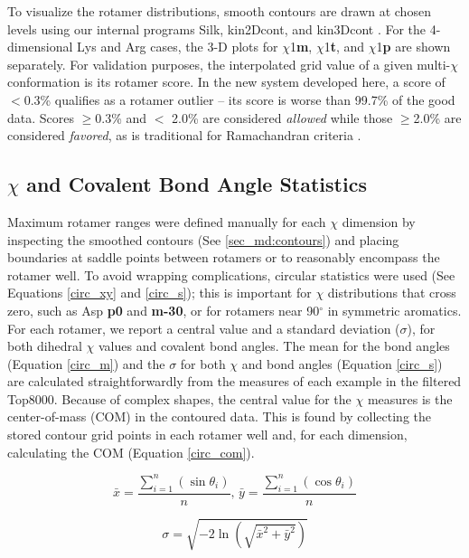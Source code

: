 To visualize the rotamer distributions, smooth contours are drawn at chosen levels using our internal programs Silk, kin2Dcont, and kin3Dcont \cite{Thesis:Word,Thesis:Davis}. For the 4-dimensional Lys and Arg cases, the 3-D plots for $\chi$1\textbf{m}, $\chi$1\textbf{t}, and $\chi$1\textbf{p} are shown separately. For validation purposes, the interpolated grid value of a given multi-$\chi$ conformation is its rotamer score. In the new system developed here, a score of $<$0.3\% qualifies as a rotamer outlier -- its score is worse than 99.7\% of the good data. Scores $\ge$0.3\% and $<$ 2.0\% are considered \textit{allowed} while those $\ge$2.0\% are considered \textit{favored}, as is traditional for Ramachandran criteria \citep{Laskowski:gl0276,Lovell:2003uq}.

\subsection{$\chi$ and Covalent Bond Angle Statistics}
\label{sec_md:chi_stats}
Maximum rotamer ranges were defined manually for each $\chi$ dimension by inspecting the smoothed contours (See \ref{sec_md:contours}) and placing boundaries at saddle points between rotamers or to reasonably encompass the rotamer well. To avoid wrapping complications, circular statistics were used (See Equations \ref{circ_xy} and \ref{circ_s}); this is important for $\chi$ distributions that cross zero, such as Asp \textbf{p0} and \textbf{m-30}, or for rotamers near 90$^{\circ}$ in symmetric aromatics. For each rotamer, we report a central value and a standard deviation ($\sigma$), for both dihedral $\chi$ values and covalent bond angles. The mean for the bond angles (Equation \ref{circ_m}) and the $\sigma$ for both $\chi$ and bond angles (Equation \ref{circ_s}) are calculated straightforwardly from the measures of each example in the filtered Top8000. Because of complex shapes, the central value for the $\chi$ measures is the center-of-mass (COM) in the contoured data. This is found by collecting the stored contour grid points in each rotamer well and, for each dimension, calculating the COM (Equation \ref{circ_com}).

\begin{equation}
\bar{x} = \frac{\sum_{i=1}^{n}\left ( \sin \theta_{i} \right )}{n}
\textrm{, }
\bar{y} = \frac{\sum_{i=1}^{n}\left ( \cos \theta_{i} \right )}{n}
\label{circ_xy}
\end{equation}

\begin{equation}
\sigma = \sqrt{-2 \ln \left ( \sqrt{\bar{x}^{2} + \bar{y}^{2}} \right )}
\label{circ_s}
\end{equation}

